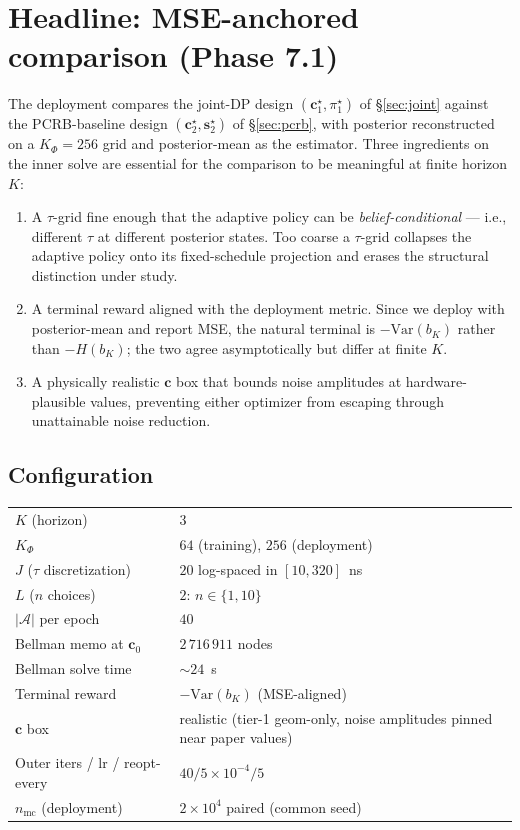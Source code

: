 \documentclass[11pt,a4paper]{article}
\begin{document}
\section{Headline: MSE-anchored comparison (Phase 7.1)}
\label{sec:mse}

The deployment compares the joint-DP design $(\bm c^\star_1, \pi^\star_1)$ of \S\ref{sec:joint} against the PCRB-baseline design $(\bm c^\star_2, \bm s^\star_2)$ of \S\ref{sec:pcrb}, with posterior reconstructed on a $K_\Phi = 256$ grid and posterior-mean as the estimator.  Three ingredients on the inner solve are essential for the comparison to be meaningful at finite horizon $K$:

\begin{enumerate}[nosep, leftmargin=2em]
  \item A $\tau$-grid fine enough that the adaptive policy can be \emph{belief-conditional} --- i.e., different $\tau$ at different posterior states.  Too coarse a $\tau$-grid collapses the adaptive policy onto its fixed-schedule projection and erases the structural distinction under study.
  \item A terminal reward aligned with the deployment metric.  Since we deploy with posterior-mean and report MSE, the natural terminal is $-\mathrm{Var}(b_K)$ rather than $-H(b_K)$; the two agree asymptotically but differ at finite $K$.
  \item A physically realistic $\bm c$ box that bounds noise amplitudes at hardware-plausible values, preventing either optimizer from escaping through unattainable noise reduction.
\end{enumerate}

\subsection{Configuration}

\begin{center}
\begin{tabular}{@{}ll@{}}
\toprule
$K$ (horizon) & $3$ \\
$K_\Phi$ & $64$ (training), $256$ (deployment) \\
$J$ ($\tau$ discretization) & $20$ log-spaced in $[10, 320]$~ns \\
$L$ ($n$ choices) & $2$: $n \in \{1, 10\}$ \\
$|\mathcal{A}|$ per epoch & $40$ \\
Bellman memo at $\bm c_0$ & $2\,716\,911$ nodes \\
Bellman solve time & $\sim\!24$~s \\
Terminal reward & $-\mathrm{Var}(b_K)$ (MSE-aligned) \\
$\bm c$ box & realistic (tier-1 geom-only, noise amplitudes pinned near paper values) \\
Outer iters / lr / reopt-every & $40 / 5\!\times\!10^{-4} / 5$ \\
$n_{\text{mc}}$ (deployment) & $2 \times 10^4$ paired (common seed) \\
\bottomrule
\end{tabular}
\end{center}
\end{document}
